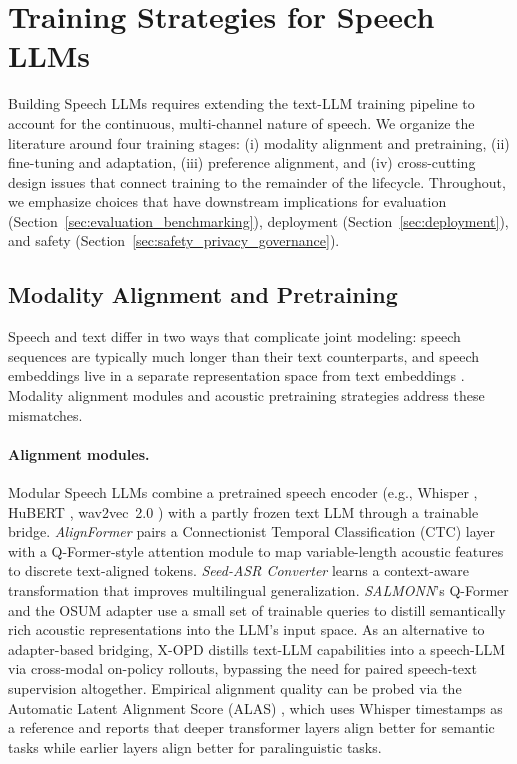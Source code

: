 \section{Training Strategies for Speech LLMs}
\label{sec:training_strategies}

Building Speech LLMs requires extending the text-LLM training pipeline to
account for the continuous, multi-channel nature of speech. We organize
the literature around four training stages: (i) modality alignment and
pretraining, (ii) fine-tuning and adaptation, (iii) preference alignment,
and (iv) cross-cutting design issues that connect training to the
remainder of the lifecycle. Throughout, we emphasize choices that have
downstream implications for evaluation
(Section~\ref{sec:evaluation_benchmarking}), deployment
(Section~\ref{sec:deployment}), and safety
(Section~\ref{sec:safety_privacy_governance}).

\subsection{Modality Alignment and Pretraining}
\label{subsec:training_pretraining}

Speech and text differ in two ways that complicate joint modeling: speech
sequences are typically much longer than their text counterparts, and
speech embeddings live in a separate representation space from text
embeddings \citep{fan2025alignformer,bai2024seed}. Modality alignment
modules and acoustic pretraining strategies address these mismatches.

\paragraph{Alignment modules.}
Modular Speech LLMs combine a pretrained speech encoder (e.g., Whisper
\citep{radford2023robust}, HuBERT \citep{hsu2021hubert}, wav2vec~2.0
\citep{baevski2020wav2vec}) with a partly frozen text LLM through a
trainable bridge. \emph{AlignFormer} \citep{fan2025alignformer} pairs a
Connectionist Temporal Classification (CTC) layer with a Q-Former-style
attention module to map variable-length acoustic features to discrete
text-aligned tokens. \emph{Seed-ASR Converter} \citep{bai2024seed} learns
a context-aware transformation that improves multilingual generalization.
\emph{SALMONN}'s Q-Former \citep{tang2023salmonn} and the OSUM adapter
\citep{geng2025osum} use a small set of trainable queries to distill
semantically rich acoustic representations into the LLM's input space.
As an alternative to adapter-based bridging, X-OPD
\citep{cao2026xopd} distills text-LLM capabilities into a speech-LLM via
cross-modal on-policy rollouts, bypassing the need for paired
speech-text supervision altogether. Empirical alignment quality can be
probed via the Automatic Latent Alignment Score (ALAS)
\citep{mousavi2025alas}, which uses Whisper timestamps as a reference and
reports that deeper transformer layers align better for semantic tasks
while earlier layers align better for paralinguistic tasks.

